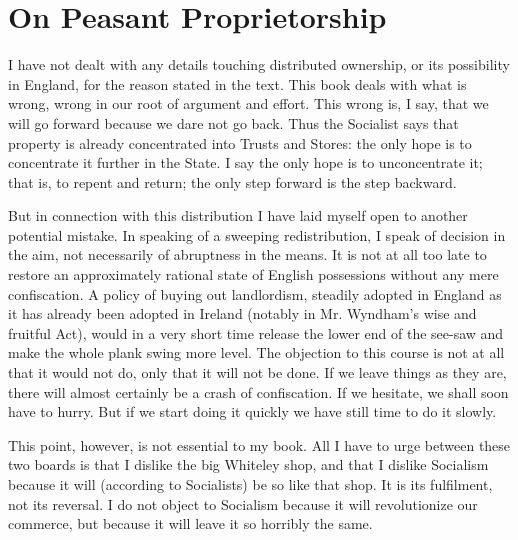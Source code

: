 \documentclass{book}
\begin{document}
\chapter{On Peasant Proprietorship}
\label{chapter-55}
I have not dealt with any details touching distributed ownership, or its possibility in England, for the reason stated in the text. This book deals with what is wrong, wrong in our root of argument and effort. This wrong is, I say, that we will go forward because we dare not go back. Thus the Socialist says that property is already concentrated into Trusts and Stores: the only hope is to concentrate it further in the State. I say the only hope is to unconcentrate it; that is, to repent and return; the only step forward is the step backward.

But in connection with this distribution I have laid myself open to another potential mistake. In speaking of a sweeping redistribution, I speak of decision in the aim, not necessarily of abruptness in the means. It is not at all too late to restore an approximately rational state of English possessions without any mere confiscation. A policy of buying out landlordism, steadily adopted in England as it has already been adopted in Ireland (notably in Mr. Wyndham’s wise and fruitful Act), would in a very short time release the lower end of the see-saw and make the whole plank swing more level. The objection to this course is not at all that it would not do, only that it will not be done. If we leave things as they are, there will almost certainly be a crash of confiscation. If we hesitate, we shall soon have to hurry. But if we start doing it quickly we have still time to do it slowly.

This point, however, is not essential to my book. All I have to urge between these two boards is that I dislike the big Whiteley shop, and that I dislike Socialism because it will (according to Socialists) be so like that shop. It is its fulfilment, not its reversal. I do not object to Socialism because it will revolutionize our commerce, but because it will leave it so horribly the same.
\end{document}
